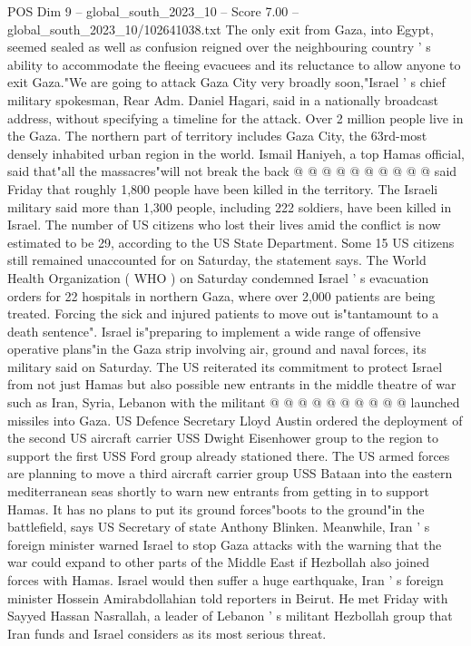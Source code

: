 \begin{textsample}{POS Dim 9 – global\_south\_2023\_10 – Score 7.00 – global\_south\_2023\_10/102641038.txt}
The only exit from Gaza, into Egypt, seemed sealed as well as confusion reigned over the neighbouring country ' s ability to accommodate the fleeing evacuees and its reluctance to allow anyone to exit Gaza."We are going to attack Gaza City very broadly soon,"Israel ' s chief military spokesman, Rear Adm.
Daniel Hagari, said in a nationally broadcast address, without specifying a timeline for the attack.
Over 2 million people live in the Gaza.
The northern part of territory includes Gaza City, the 63rd-most densely inhabited urban region in the world.
Ismail Haniyeh, a top Hamas official, said that"all the massacres"will not break the back @ @ @ @ @ @ @ @ @ @ said Friday that roughly 1,800 people have been killed in the territory.
The Israeli military said more than 1,300 people, including 222 soldiers, have been killed in Israel.
The number of US citizens who lost their lives amid the conflict is now estimated to be 29, according to the US State Department.
Some 15 US citizens still remained unaccounted for on Saturday, the statement says.
The World Health Organization ( WHO ) on Saturday condemned Israel ' s evacuation orders for 22 hospitals in northern Gaza, where over 2,000 patients are being treated.
Forcing the sick and injured patients to move out is"tantamount to a death sentence".
Israel is"preparing to implement a wide range of offensive operative plans"in the Gaza strip involving air, ground and naval forces, its military said on Saturday.
The US reiterated its commitment to protect Israel from not just Hamas but also possible new entrants in the middle theatre of war such as Iran, Syria, Lebanon with the militant @ @ @ @ @ @ @ @ @ @ launched missiles into Gaza.
US Defence Secretary Lloyd Austin ordered the deployment of the second US aircraft carrier USS Dwight Eisenhower group to the region to support the first USS Ford group already stationed there.
The US armed forces are planning to move a third aircraft carrier group USS Bataan into the eastern mediterranean seas shortly to warn new entrants from getting in to support Hamas.
It has no plans to put its ground forces"boots to the ground"in the battlefield, says US Secretary of state Anthony Blinken.
Meanwhile, Iran ' s foreign minister warned Israel to stop Gaza attacks with the warning that the war could expand to other parts of the Middle East if Hezbollah also joined forces with Hamas.
Israel would then suffer a huge earthquake, Iran ' s foreign minister Hossein Amirabdollahian told reporters in Beirut.
He met Friday with Sayyed Hassan Nasrallah, a leader of Lebanon ' s militant Hezbollah group that Iran funds and Israel considers as its most serious threat.

\end{textsample}
